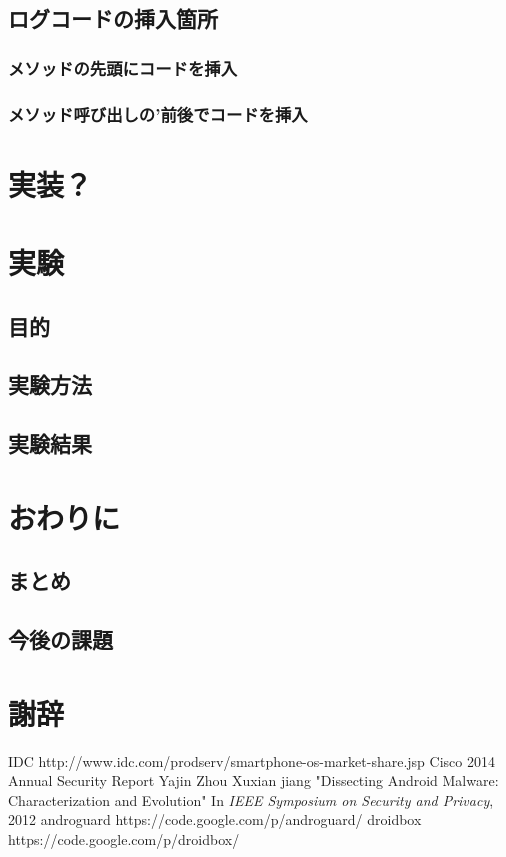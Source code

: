 \documentclass[10pt]{jsarticle}
\begin{document}
\subsection{ログコードの挿入箇所}

\subsubsection{メソッドの先頭にコードを挿入}
 
\subsubsection{メソッド呼び出しの’前後でコードを挿入}
 
\newpage
\section{実装？}

\newpage
\section{実験}

\subsection{目的}

\subsection{実験方法}

\subsection{実験結果}


\newpage
\section{おわりに}

\subsection{まとめ}

\subsection{今後の課題}

\newpage
\section*{謝辞}
\begin{thebibliography}{9}
	 IDC http://www.idc.com/prodserv/smartphone-os-market-share.jsp
	 Cisco 2014 Annual Security Report
	 Yajin Zhou Xuxian jiang "Dissecting Android Malware: Characterization and Evolution" In {\it IEEE Symposium on Security and Privacy}, 2012
	 androguard https://code.google.com/p/androguard/
	 droidbox https://code.google.com/p/droidbox/
\end{thebibliography}
\end{document}
